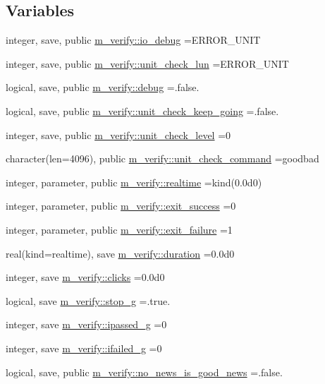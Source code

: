 \subsection*{Variables}
\begin{DoxyCompactItemize}
\item 
integer, save, public \mbox{\hyperlink{namespacem__verify_a7014b3aa584eb29266bf52fc6e03e6ed}{m\+\_\+verify\+::io\+\_\+debug}} =E\+R\+R\+O\+R\+\_\+\+U\+N\+IT
\item 
integer, save, public \mbox{\hyperlink{namespacem__verify_a65569c8b4be204251ba14430ad18372d}{m\+\_\+verify\+::unit\+\_\+check\+\_\+lun}} =E\+R\+R\+O\+R\+\_\+\+U\+N\+IT
\item 
logical, save, public \mbox{\hyperlink{namespacem__verify_a0f87b43bebf70897f9ec711be3f01839}{m\+\_\+verify\+::debug}} =.false.
\item 
logical, save, public \mbox{\hyperlink{namespacem__verify_a434af7c4d380da5b85d49dc07466dde8}{m\+\_\+verify\+::unit\+\_\+check\+\_\+keep\+\_\+going}} =.false.
\item 
integer, save, public \mbox{\hyperlink{namespacem__verify_afe37222ddb2a9470e1a0e9c40e2dcce3}{m\+\_\+verify\+::unit\+\_\+check\+\_\+level}} =0
\item 
character(len=4096), public \mbox{\hyperlink{namespacem__verify_aaa3c6dfa94a9414592071525036020d4}{m\+\_\+verify\+::unit\+\_\+check\+\_\+command}} =\textquotesingle{}goodbad\textquotesingle{}
\item 
integer, parameter, public \mbox{\hyperlink{namespacem__verify_a7f6aa94b09b3824bc5c15bc74e757d6b}{m\+\_\+verify\+::realtime}} =kind(0.\+0d0)
\item 
integer, parameter, public \mbox{\hyperlink{namespacem__verify_a278d7a36f55fac875e4f94bc893447fe}{m\+\_\+verify\+::exit\+\_\+success}} =0
\item 
integer, parameter, public \mbox{\hyperlink{namespacem__verify_a458c47b6b47738f8ebadddb4a944d0e0}{m\+\_\+verify\+::exit\+\_\+failure}} =1
\item 
real(kind=realtime), save \mbox{\hyperlink{namespacem__verify_a77729c599fbd8aed6075a05fb3c38146}{m\+\_\+verify\+::duration}} =0.\+0d0
\item 
integer, save \mbox{\hyperlink{namespacem__verify_af97c7f92394811bec5fed506fdfab67d}{m\+\_\+verify\+::clicks}} =0.\+0d0
\item 
logical, save \mbox{\hyperlink{namespacem__verify_a425cad68370e8552495e1838b2e34734}{m\+\_\+verify\+::stop\+\_\+g}} =.true.
\item 
integer, save \mbox{\hyperlink{namespacem__verify_ada62999b3a1ef795c335deccac28cda5}{m\+\_\+verify\+::ipassed\+\_\+g}} =0
\item 
integer, save \mbox{\hyperlink{namespacem__verify_ab18f1875be62b6aa1e101894358b617f}{m\+\_\+verify\+::ifailed\+\_\+g}} =0
\item 
logical, save, public \mbox{\hyperlink{namespacem__verify_aa827fd6225334c65efe89d1d0af79efa}{m\+\_\+verify\+::no\+\_\+news\+\_\+is\+\_\+good\+\_\+news}} =.false.
\end{DoxyCompactItemize}
